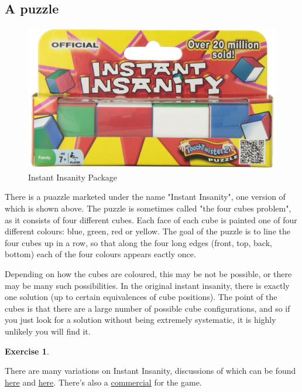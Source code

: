 \documentclass[10pt,]{book}
\theoremstyle{plain}
\theoremstyle{definition}
\theoremstyle{definition}
\theoremstyle{definition}
\newtheorem{exercise}[theorem]{Exercise}
\begin{document}
\subsection[{A puzzle}]{A puzzle}\label{subsection-10}
\leavevmode%
\begin{figure}
\centering
\includegraphics[width=NaN\linewidth]{images/InstantInsanityPackage.JPG}
\caption{Instant Insanity Package\label{figure-1}}
\end{figure}
\hypertarget{p-54}{}%
There is a puazzle marketed under the name "Instant Insanity", one version of which is shown above.  The puzzle is sometimes called "the four cubes problem", as it consists of four different cubes.   Each face of each cube is painted one of four different colours: blue, green, red or yellow. The goal of the puzzle is to line the four cubes up in a row, so that along the four long edges (front, top, back, bottom) each of the four colours appears eactly once.%
\par
\hypertarget{p-55}{}%
Depending on how the cubes are coloured, this may be not be possible, or there may be many such possibilities. In the original instant insanity, there is exactly one solution (up to certain equivalences of cube positions).  The point of the cubes is that there are a large number of possible cube configurations, and so if you just look for a solution without being extremely systematic, it is highly unlikely you will find it.%
\begin{exercise}\label{exercise-2}
\end{exercise}
\hypertarget{p-57}{}%
There are many variations on Instant Insanity, discussions of which can be found \href{http://www.cs.brandeis.edu/\~storer/JimPuzzles/ZPAGES/zzzInstantInsanity.html}{here} and \href{http://www.jaapsch.net/puzzles/insanity.htm}{here}. There’s also a \href{https://www.youtube.com/watch?v=CQ2gHSKZBEw}{commercial} for the game.%
\typeout{************************************************}
\typeout{************************************************}
\end{document}
